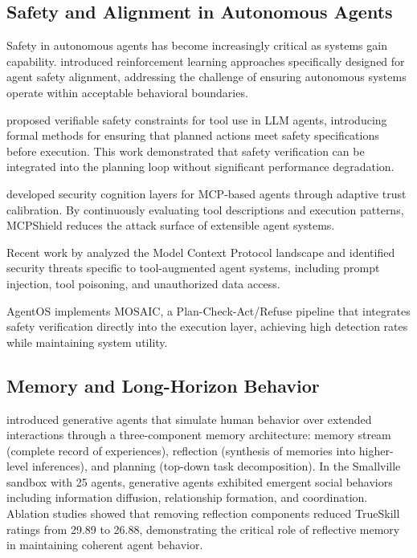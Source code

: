 \documentclass{article}
\begin{document}
\subsection{Safety and Alignment in Autonomous Agents}

Safety in autonomous agents has become increasingly critical as systems gain capability. \citet{sha2025safety} introduced reinforcement learning approaches specifically designed for agent safety alignment, addressing the challenge of ensuring autonomous systems operate within acceptable behavioral boundaries.

\citet{doshi2026safe} proposed verifiable safety constraints for tool use in LLM agents, introducing formal methods for ensuring that planned actions meet safety specifications before execution. This work demonstrated that safety verification can be integrated into the planning loop without significant performance degradation.

\citet{mcpshield2026} developed security cognition layers for MCP-based agents through adaptive trust calibration. By continuously evaluating tool descriptions and execution patterns, MCPShield reduces the attack surface of extensible agent systems.

Recent work by \citet{hou2025mcp} analyzed the Model Context Protocol landscape and identified security threats specific to tool-augmented agent systems, including prompt injection, tool poisoning, and unauthorized data access.

AgentOS implements MOSAIC, a Plan-Check-Act/Refuse pipeline that integrates safety verification directly into the execution layer, achieving high detection rates while maintaining system utility.

\subsection{Memory and Long-Horizon Behavior}

\citet{park2023generative} introduced generative agents that simulate human behavior over extended interactions through a three-component memory architecture: memory stream (complete record of experiences), reflection (synthesis of memories into higher-level inferences), and planning (top-down task decomposition). In the Smallville sandbox with 25 agents, generative agents exhibited emergent social behaviors including information diffusion, relationship formation, and coordination. Ablation studies showed that removing reflection components reduced TrueSkill ratings from 29.89 to 26.88, demonstrating the critical role of reflective memory in maintaining coherent agent behavior.
\end{document}
